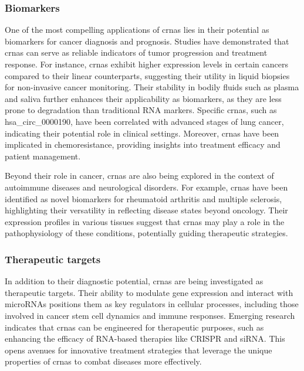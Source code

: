 \subsubsection{Biomarkers}
One of the most compelling applications of \glspl{crna} lies in their potential
as biomarkers for cancer diagnosis and prognosis.
Studies have demonstrated that \glspl{crna} can serve as reliable indicators of
tumor progression and treatment response.
For instance, \glspl{crna} exhibit higher expression levels in certain cancers
compared to their linear counterparts, suggesting their utility in liquid
biopsies for non-invasive cancer
monitoring\supercite{bao_prognostic_2020,ren_construction_2017}.
Their stability in bodily fluids such as plasma and saliva further enhances
their applicability as biomarkers, as they are less prone to degradation than
traditional RNA markers\supercite{bao_prognostic_2020,zhang_circular_2018}.
Specific \glspl{crna}, such as hsa\_circ\_0000190, have been correlated with
advanced stages of lung cancer, indicating their potential role in clinical
settings\supercite{luo_plasma_2020}.
Moreover, \glspl{crna} have been implicated in chemoresistance, providing
insights into treatment efficacy and patient
management\supercite{geng_function_2018,feng_functions_2019}.

Beyond their role in cancer, \glspl{crna} are also being explored in the
context of autoimmune diseases and neurological disorders.
For example, \glspl{crna} have been identified as novel biomarkers for
rheumatoid arthritis and multiple sclerosis, highlighting their versatility in
reflecting disease states beyond
oncology\supercite{ouyang_identification_2021,he_exosomal_2019}.
Their expression profiles in various tissues suggest that \glspl{crna} may play
a role in the pathophysiology of these conditions, potentially guiding
therapeutic strategies\supercite{mohammed_circular_2023}.

\subsubsection{Therapeutic targets}
In addition to their diagnostic potential, \glspl{crna} are being investigated
as therapeutic targets.
Their ability to modulate gene expression and interact with microRNAs positions
them as key regulators in cellular processes, including those involved in
cancer stem cell dynamics and immune responses\supercite{cheng_emerging_2023}.
Emerging research indicates that \glspl{crna} can be engineered for therapeutic
purposes, such as enhancing the efficacy of RNA-based therapies like CRISPR and
siRNA\supercite{wesselhoeft_engineering_2018}.
This opens avenues for innovative treatment strategies that leverage the unique
properties of \glspl{crna} to combat diseases more effectively.
